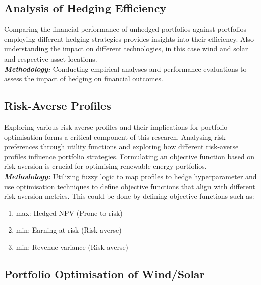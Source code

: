 \subsection{Analysis of Hedging Efficiency}
    \label{subsec:rs_analysis-of-hedging-efficiency}

    Comparing the financial performance of unhedged portfolios against portfolios employing different hedging strategies
    provides insights into their efficiency.
    Also understanding the impact on different technologies, in this case wind and solar and respective asset
    locations.\\

    \textbf{\textit{Methodology: }} Conducting empirical analyses and performance evaluations to assess the
    impact of hedging on financial outcomes.

\subsection{Risk-Averse Profiles}
    \label{subsec:rs_risk-averse-profiles}

    Exploring various risk-averse profiles and their implications for portfolio optimisation forms
    a critical component of this research.
    Analysing risk preferences through utility functions and exploring how
    different risk-averse profiles influence portfolio strategies.
    Formulating an objective function based on risk aversion is crucial for optimising renewable energy portfolios.\\

    \textbf{\textit{Methodology: }} Utilizing fuzzy logic to map profiles to hedge hyperparameter and use optimisation techniques to define objective
    functions that align with different risk aversion metrics.
    This could be done by defining objective functions such as:
    \begin{enumerate} %
        \item max: Hedged-NPV (Prone to risk)
        \item min: Earning at risk (Risk-averse)
        \item min: Revenue variance (Risk-averse)
    \end{enumerate}
\subsection{Portfolio Optimisation of Wind/Solar}
    \label{subsec:rs_portfolio-optimization-of-wind/solar}

